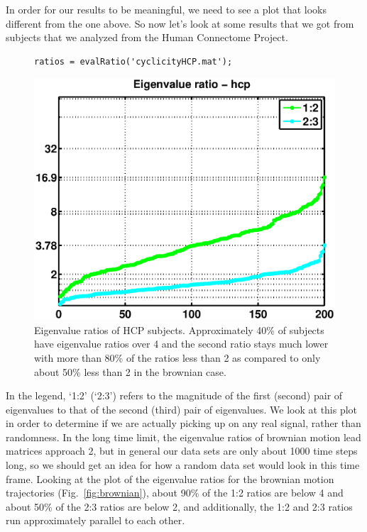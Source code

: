 \documentclass[11pt]{article}
\def\f{Fig.}
\begin{document}
In order for our results to be meaningful, we need to see a plot that looks different from the one above. So now let's look at some results that we got from subjects that we analyzed from the Human Connectome Project.

\begin{figure}[H]
\begin{minipage}{.6\linewidth}
\begin{lstlisting}
ratios = evalRatio('cyclicityHCP.mat');
\end{lstlisting}
\end{minipage}
\hfill
\begin{minipage}{.39\linewidth}
\includegraphics[width=\linewidth]{figs/hcp_evalRatio.eps}
\end{minipage}
\caption{Eigenvalue ratios of HCP subjects. Approximately 40\% of subjects have eigenvalue ratios over 4 and the second ratio stays much lower with more than 80\% of the ratios less than 2 as compared to only about 50\% less than 2 in the brownian case.}
\label{fig:hcpevals}
\end{figure}

In the legend, `1:2' (`2:3') refers to the magnitude of the first (second) pair of eigenvalues to that of the second (third) pair of eigenvalues. We look at this plot in order to determine if we are actually picking up on any real signal, rather than randomness. In the long time limit, the eigenvalue ratios of brownian motion lead matrices approach 2, but in general our data sets are only about 1000 time steps long, so we should get an idea for how a random data set would look in this time frame. Looking at the plot of the eigenvalue ratios for the brownian motion trajectories (\f~\ref{fig:brownian}), about 90\% of the 1:2 ratios are below 4 and about 50\% of the 2:3 ratios are below 2, and additionally, the 1:2 and 2:3 ratios run approximately parallel to each other. 
\end{document}
